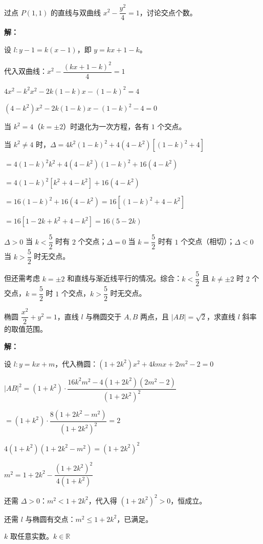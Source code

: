 \documentclass[12pt, a4paper]{ctexart}
\begin{document}
\begin{examplebox}[【例题10】直线与双曲线交点个数]
过点 $P(1,1)$ 的直线与双曲线 $x^2-\dfrac{y^2}{4}=1$，讨论交点个数。

\textbf{解：}

设 $l: y-1=k(x-1)$，即 $y=kx+1-k$。

代入双曲线：$x^2-\dfrac{(kx+1-k)^2}{4}=1$

$4x^2-k^2 x^2-2k(1-k)x-(1-k)^2=4$

$(4-k^2)x^2-2k(1-k)x-(1-k)^2-4=0$

当 $k^2=4$（$k=\pm 2$）时退化为一次方程，各有 $1$ 个交点。

当 $k^2\neq 4$ 时，$\Delta=4k^2(1-k)^2+4(4-k^2)[(1-k)^2+4]$

$=4(1-k)^2 k^2+4(4-k^2)(1-k)^2+16(4-k^2)$

$=4(1-k)^2[k^2+4-k^2]+16(4-k^2)$

$=16(1-k)^2+16(4-k^2)=16[(1-k)^2+4-k^2]$

$=16[1-2k+k^2+4-k^2]=16(5-2k)$

$\Delta>0$ 当 $k<\dfrac{5}{2}$ 时有 $2$ 个交点；$\Delta=0$ 当 $k=\dfrac{5}{2}$ 时有 $1$ 个交点（相切）；$\Delta<0$ 当 $k>\dfrac{5}{2}$ 时无交点。

但还需考虑 $k=\pm 2$ 和直线与渐近线平行的情况。综合：$k<\dfrac{5}{2}$ 且 $k\neq\pm 2$ 时 $2$ 个交点，$k=\dfrac{5}{2}$ 时 $1$ 个交点，$k>\dfrac{5}{2}$ 时无交点。
\end{examplebox}

\begin{examplebox}[【例题11】韦达定理与参数范围]
椭圆 $\dfrac{x^2}{2}+y^2=1$，直线 $l$ 与椭圆交于 $A,B$ 两点，且 $|AB|=\sqrt{2}$，求直线 $l$ 斜率的取值范围。

\textbf{解：}

设 $l: y=kx+m$，代入椭圆：$(1+2k^2)x^2+4kmx+2m^2-2=0$

$|AB|^2=(1+k^2)\cdot\dfrac{16k^2 m^2-4(1+2k^2)(2m^2-2)}{(1+2k^2)^2}$

$=(1+k^2)\cdot\dfrac{8(1+2k^2-m^2)}{(1+2k^2)^2}=2$

$4(1+k^2)(1+2k^2-m^2)=(1+2k^2)^2$

$m^2=1+2k^2-\dfrac{(1+2k^2)^2}{4(1+k^2)}$

还需 $\Delta>0$：$m^2<1+2k^2$，代入得 $(1+2k^2)^2>0$，恒成立。

还需 $l$ 与椭圆有交点：$m^2\leq 1+2k^2$，已满足。

$k$ 取任意实数。$\boxed{k\in\mathbb{R}}$
\end{examplebox}
\end{document}
